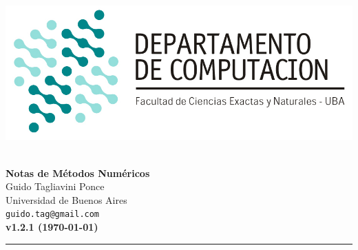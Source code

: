 \hfill \includegraphics[scale = 0.75]{imagenes/logo_dc.jpg}~\\[0.25cm]

\begin{center}
	\textbf{\Large Notas de Métodos Numéricos}\\[1cm]
	{\large Guido Tagliavini Ponce\\[0.15cm]}
	Universidad de Buenos Aires\\[0.15cm]
	\texttt{guido.tag@gmail.com}\\[1cm]
	\textbf{v1.2.1 (\today)}\\[1cm]
\end{center}
\rule{\linewidth}{0.2mm}
